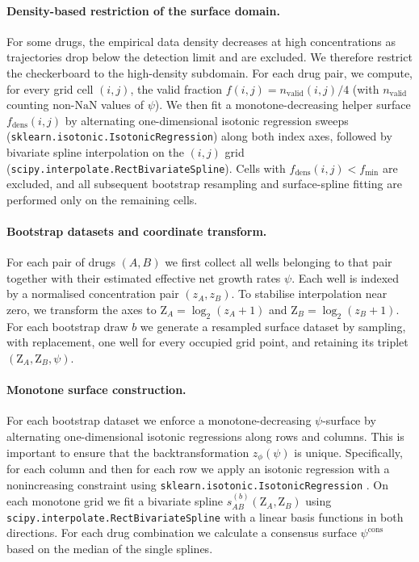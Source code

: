 \paragraph{Density-based restriction of the surface domain.}
For some drugs, the empirical data density decreases at high concentrations as trajectories drop below the detection limit and are excluded.
We therefore restrict the checkerboard to the high-density subdomain.
For each drug pair, we compute, for every grid cell \((i,j)\), the valid fraction \(f(i,j)=n_{\mathrm{valid}}(i,j)/4\) (with \(n_{\mathrm{valid}}\) counting non-\(\mathrm{NaN}\) values of \(\psi\)).
We then fit a monotone-decreasing helper surface \(f_{\mathrm{dens}}(i,j)\) by alternating one-dimensional isotonic regression sweeps (\texttt{sklearn.isotonic.IsotonicRegression}) along both index axes, followed by bivariate spline interpolation on the \((i,j)\) grid (\texttt{scipy.interpolate.RectBivariateSpline}).
Cells with \(f_{\mathrm{dens}}(i,j)<f_{\min}\) are excluded, and all subsequent bootstrap resampling and surface-spline fitting are performed only on the remaining cells.

\paragraph{Bootstrap datasets and coordinate transform.}
For each pair of drugs \((A,B)\) we first collect all wells belonging to that pair together with their estimated effective net growth rates \(\psi\).
Each well is indexed by a normalised concentration pair  \((z_A, z_B)\).
To stabilise interpolation near zero, we transform the axes to \(\mathrm{Z}_A=\log_2(z_A+1)\) and \(\mathrm{Z}_B=\log_2(z_B+1)\).
For each bootstrap draw \(b\) we generate a resampled surface dataset by sampling, with replacement, one well for every occupied grid point, and retaining its triplet \((\mathrm{Z}_A,\mathrm{Z}_B,\psi)\).

\paragraph{Monotone surface construction.}
For each bootstrap dataset we enforce a monotone-decreasing \(\psi\)-surface by alternating one-dimensional isotonic regressions along rows and columns.
This is important to ensure that the backtransformation $z_\phi(\psi)$ is unique.
Specifically, for each column and then for each row we apply an isotonic regression with a nonincreasing constraint using \texttt{sklearn.isotonic.IsotonicRegression} \cite{Pedregosa2011}.
On each monotone grid we fit a bivariate spline \(s_{AB}^{(b)}(\mathrm{Z}_A,\mathrm{Z}_B)\) using \texttt{scipy.interpolate.RectBivariateSpline} with a linear basis functions in both directions.
For each drug combination we calculate a consensus surface $\psi^\mathrm{cons}$ based on the median of the single splines.

